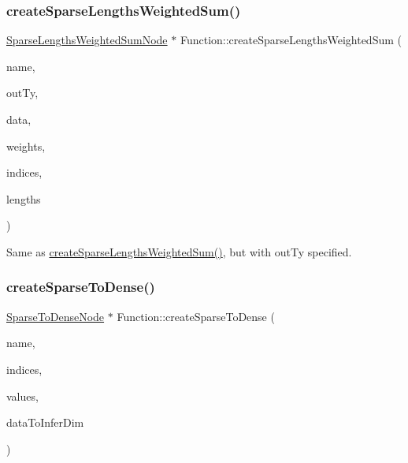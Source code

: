 \subsubsection{\texorpdfstring{create\+Sparse\+Lengths\+Weighted\+Sum()}{createSparseLengthsWeightedSum()}\hspace{0.1cm}{\footnotesize\ttfamily [2/2]}}
{\footnotesize\ttfamily \hyperlink{classglow_1_1_sparse_lengths_weighted_sum_node}{Sparse\+Lengths\+Weighted\+Sum\+Node} $\ast$ Function\+::create\+Sparse\+Lengths\+Weighted\+Sum (\begin{DoxyParamCaption}\item[{llvm\+::\+String\+Ref}]{name,  }\item[{\hyperlink{structglow_1_1_type}{Type\+Ref}}]{out\+Ty,  }\item[{\hyperlink{structglow_1_1_node_value}{Node\+Value}}]{data,  }\item[{\hyperlink{structglow_1_1_node_value}{Node\+Value}}]{weights,  }\item[{\hyperlink{structglow_1_1_node_value}{Node\+Value}}]{indices,  }\item[{\hyperlink{structglow_1_1_node_value}{Node\+Value}}]{lengths }\end{DoxyParamCaption})}

Same as \hyperlink{classglow_1_1_function_a294f7aafb024ab39071832980f90fa8d}{create\+Sparse\+Lengths\+Weighted\+Sum()}, but with {\ttfamily out\+Ty} specified. \mbox{\label{classglow_1_1_function_aa30faa862c948082d65911e42d9745e3}} 
\subsubsection{\texorpdfstring{create\+Sparse\+To\+Dense()}{createSparseToDense()}}
{\footnotesize\ttfamily \hyperlink{classglow_1_1_sparse_to_dense_node}{Sparse\+To\+Dense\+Node} $\ast$ Function\+::create\+Sparse\+To\+Dense (\begin{DoxyParamCaption}\item[{llvm\+::\+String\+Ref}]{name,  }\item[{\hyperlink{structglow_1_1_node_value}{Node\+Value}}]{indices,  }\item[{\hyperlink{structglow_1_1_node_value}{Node\+Value}}]{values,  }\item[{\hyperlink{structglow_1_1_node_value}{Node\+Value}}]{data\+To\+Infer\+Dim }\end{DoxyParamCaption})}

